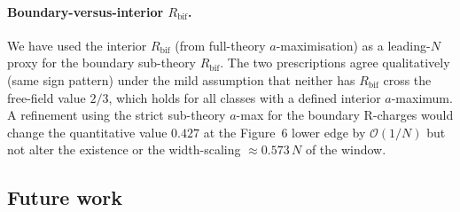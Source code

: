 \paragraph{Boundary-versus-interior $R_{\text{bif}}$.}  We have used
the interior $R_{\text{bif}}$ (from full-theory $a$-maximisation) as
a leading-$N$ proxy for the boundary sub-theory $R_{\text{bif}}$.
The two prescriptions agree qualitatively (same sign pattern) under
the mild assumption that neither has $R_{\text{bif}}$ cross the
free-field value $2/3$, which holds for all classes with a defined
interior $a$-maximum.  A
refinement using the strict sub-theory $a$-max for the boundary
R-charges would change the quantitative value $0.427$ at the
Figure~6 lower edge by $\mathcal O(1/N)$ but not alter the existence
or the width-scaling $\approx 0.573\,N$ of the window.

\subsection{Future work}
\label{sec:future}

